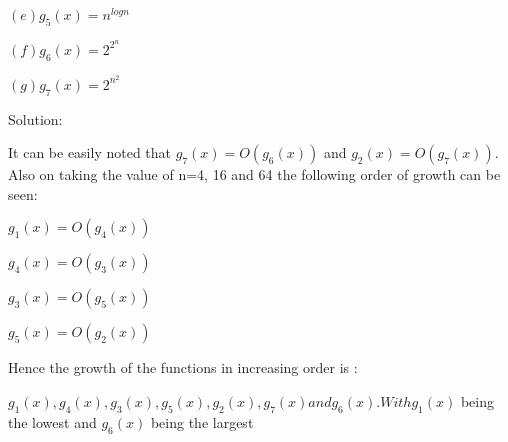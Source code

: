 \documentclass[letterpaper,portrait,12pt]{article}
\begin{document}
\begin{flushleft}
$(e)g_5(x)=n^{logn}
$
\end{flushleft}


\begin{flushleft}
$(f)g_6(x)=2^{2^{n}}$
\end{flushleft}


\begin{flushleft}
$(g)g_7(x)=2^{n^{2}}$
\end{flushleft}


\begin{flushleft}

\end{flushleft}


\begin{flushleft}
Solution:
\end{flushleft}


\begin{flushleft}
It can be easily noted that $g_7(x)=O(g_6(x))$ and $g_2(x)=O(g_7(x))$. Also on taking the value of n=4, 16 and 64 the following order of growth can be seen:
\end{flushleft}


\begin{flushleft}
$g_1(x)=O(g_4(x))$
\end{flushleft}


\begin{flushleft}
$g_4(x)=O(g_3(x))
$
\end{flushleft}


\begin{flushleft}
$g_3(x)=O(g_5(x))
$
\end{flushleft}


\begin{flushleft}
$g_5(x)=O(g_2(x))
$
\end{flushleft}


\begin{flushleft}
Hence the growth of the functions in increasing order is :
\end{flushleft}


\begin{flushleft}

\end{flushleft}


\begin{flushleft}
$g_1(x), g_4(x), g_3(x), g_5(x), g_2(x), g_7(x) and g_6(x). With g_1(x)$  being the lowest and $g_6(x) $ being the largest
\end{flushleft}
\end{document}
